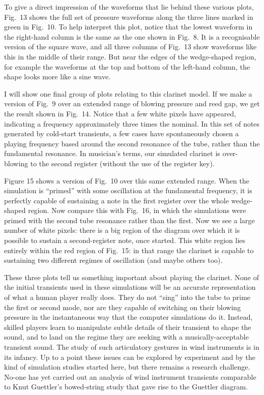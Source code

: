   To give a direct impression of the waveforms that lie behind these various 
  plots, Fig.\ 13 shows the full set of pressure waveforms along the three 
  lines marked in green in Fig.\ 10. To help interpret this plot, notice that 
  the lowest waveform in the right-hand column is the same as the one shown in 
  Fig.\ 8. It is a recognisable version of the square wave, and all three 
  columns of Fig.\ 13 show waveforms like this in the middle of their range. 
  But near the edges of the wedge-shaped region, for example the waveforms at 
  the top and bottom of the left-hand column, the shape looks more like a sine 
  wave. 

  I will show one final group of plots relating to this clarinet model. If we 
  make a version of Fig.\ 9 over an extended range of blowing pressure and reed 
  gap, we get the result shown in Fig.\ 14. Notice that a few white pixels have 
  appeared, indicating a frequency approximately three times the nominal. In 
  this set of notes generated by cold-start transients, a few cases have 
  spontaneously chosen a playing frequency based around the second resonance of 
  the tube, rather than the fundamental resonance. In musician's terms, our 
  simulated clarinet is over-blowing to the second register (without the use of 
  the register key). 

  Figure 15 shows a version of Fig.\ 10 over this same extended range. When the 
  simulation is “primed” with some oscillation at the fundamental frequency, it 
  is perfectly capable of sustaining a note in the first register over the 
  whole wedge-shaped region. Now compare this with Fig.\ 16, in which the 
  simulations were primed with the second tube resonance rather than the first. 
  Now we see a large number of white pixels: there is a big region of the 
  diagram over which it is possible to sustain a second-register note, once 
  started. This white region lies entirely within the red region of Fig.\ 15: 
  in that range the clarinet is capable to sustaining two different regimes of 
  oscillation (and maybe others too). 

  These three plots tell us something important about playing the clarinet. 
  None of the initial transients used in these simulations will be an accurate 
  representation of what a human player really does. They do not “sing” into 
  the tube to prime the first or second mode, nor are they capable of switching 
  on their blowing pressure in the instantaneous way that the computer 
  simulations do it. Instead, skilled players learn to manipulate subtle 
  details of their transient to shape the sound, and to land on the regime they 
  are seeking with a musically-acceptable transient sound. The study of such 
  articulatory gestures in wind instruments is in its infancy. Up to a point 
  these issues can be explored by experiment and by the kind of simulation 
  studies started here, but there remains a research challenge. No-one has yet 
  carried out an analysis of wind instrument transients comparable to Knut 
  Guettler’s bowed-string study that gave rise to the Guettler diagram. 


